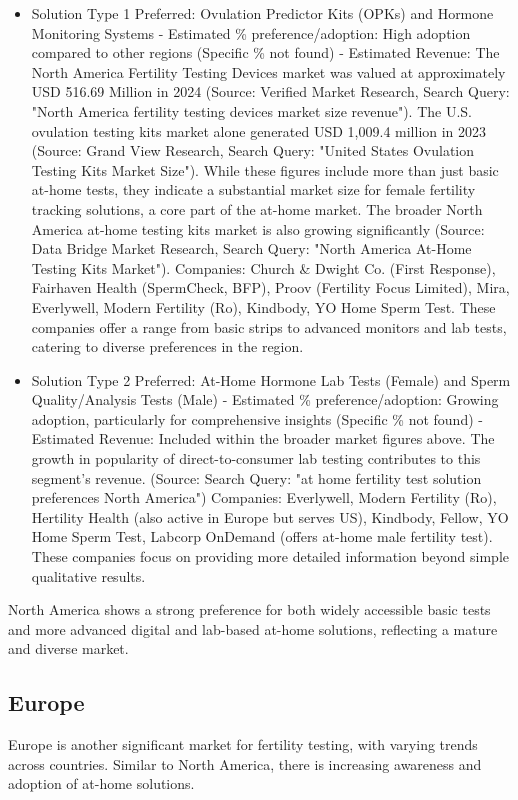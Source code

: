 \documentclass{article}
\begin{document}
\begin{itemize}
  \item Solution Type 1 Preferred: Ovulation Predictor Kits (OPKs) and Hormone Monitoring Systems - Estimated \% preference/adoption: High adoption compared to other regions (Specific \% not found) - Estimated Revenue: The North America Fertility Testing Devices market was valued at approximately USD 516.69 Million in 2024 (Source: Verified Market Research, Search Query: "North America fertility testing devices market size revenue"). The U.S. ovulation testing kits market alone generated USD 1,009.4 million in 2023 (Source: Grand View Research, Search Query: "United States Ovulation Testing Kits Market Size"). While these figures include more than just basic at-home tests, they indicate a substantial market size for female fertility tracking solutions, a core part of the at-home market. The broader North America at-home testing kits market is also growing significantly (Source: Data Bridge Market Research, Search Query: "North America At-Home Testing Kits Market").
    Companies: Church \& Dwight Co. (First Response), Fairhaven Health (SpermCheck, BFP), Proov (Fertility Focus Limited), Mira, Everlywell, Modern Fertility (Ro), Kindbody, YO Home Sperm Test. These companies offer a range from basic strips to advanced monitors and lab tests, catering to diverse preferences in the region.
  \item Solution Type 2 Preferred: At-Home Hormone Lab Tests (Female) and Sperm Quality/Analysis Tests (Male) - Estimated \% preference/adoption: Growing adoption, particularly for comprehensive insights (Specific \% not found) - Estimated Revenue: Included within the broader market figures above. The growth in popularity of direct-to-consumer lab testing contributes to this segment's revenue. (Source: Search Query: "at home fertility test solution preferences North America")
    Companies: Everlywell, Modern Fertility (Ro), Hertility Health (also active in Europe but serves US), Kindbody, Fellow, YO Home Sperm Test, Labcorp OnDemand (offers at-home male fertility test). These companies focus on providing more detailed information beyond simple qualitative results.
\end{itemize}
North America shows a strong preference for both widely accessible basic tests and more advanced digital and lab-based at-home solutions, reflecting a mature and diverse market.

\subsection{Europe}
Europe is another significant market for fertility testing, with varying trends across countries. Similar to North America, there is increasing awareness and adoption of at-home solutions.
\end{document}
